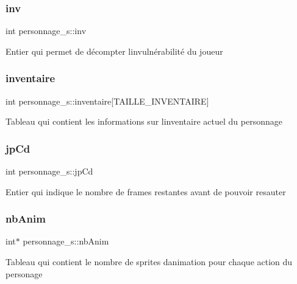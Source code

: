 \subsubsection{\texorpdfstring{inv}{inv}}
{\footnotesize\ttfamily int personnage\+\_\+s\+::inv}

Entier qui permet de décompter l\textquotesingle{}invulnérabilité du joueur \mbox{\label{structpersonnage__s_a0aefe070eb6c9c73fe6a40c909d2dc30}} 
\subsubsection{\texorpdfstring{inventaire}{inventaire}}
{\footnotesize\ttfamily int personnage\+\_\+s\+::inventaire\mbox{[}T\+A\+I\+L\+L\+E\+\_\+\+I\+N\+V\+E\+N\+T\+A\+I\+RE\mbox{]}}

Tableau qui contient les informations sur l\textquotesingle{}inventaire actuel du personnage \mbox{\label{structpersonnage__s_a05d061a818efa6b7bfa5b3c76ba3b8dd}} 
\subsubsection{\texorpdfstring{jp\+Cd}{jpCd}}
{\footnotesize\ttfamily int personnage\+\_\+s\+::jp\+Cd}

Entier qui indique le nombre de frames restantes avant de pouvoir resauter \mbox{\label{structpersonnage__s_a05aa3037a7469f58464094d2bd2d683a}} 
\subsubsection{\texorpdfstring{nb\+Anim}{nbAnim}}
{\footnotesize\ttfamily int$\ast$ personnage\+\_\+s\+::nb\+Anim}

Tableau qui contient le nombre de sprites d\textquotesingle{}animation pour chaque action du personage \mbox{\label{structpersonnage__s_a47e8c34ccb98b49ca57baa55d4326ee3}} 
